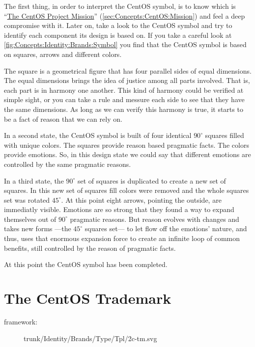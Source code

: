 The first thing, in order to interpret the CentOS symbol, is to know
which is ``\hyperlink{sec:Concepts:CentOS:Mission}{The CentOS Project
Mission}'' (\autoref{sec:Concepts:CentOS:Mission}) and feel a deep
compromise with it.  Later on, take a look to the CentOS symbol and
try to identify each component its design is based on. If you take a
careful look at \autoref{fig:Concepts:Identity:Brands:Symbol} you find
that the CentOS symbol is based on squares, arrows and different
colors.

The square is a geometrical figure that has four parallel sides of
equal dimensions. The equal dimensions brings the idea of justice
among all parts involved. That is, each part is in harmony one
another. This kind of harmony could be verified at simple sight, or
you can take a rule and messure each side to see that they have the
same dimensions.  As long as we can verify this harmony is true, it
starts to be a fact of reason that we can rely on. 

In a second state, the CentOS symbol is built of four identical
$90^{\circ}$ squares filled with unique colors. The squares provide
reason based pragmatic facts. The colors provide emotions. So, in this
design state we could say that different emotions are controlled by
the same pragmatic reasons.

In a third state, the $90^{\circ}$ set of squares is duplicated to
create a new set of squares. In this new set of squares fill colors
were removed and the whole squares set was rotated $45^{\circ}$.  At
this point eight arrows, pointing the outside, are immediatly visible.
Emotions are so strong that they found a way to expand themselves out
of $90^{\circ}$ pragmatic reasons.  But reason evolves with changes
and takes new forms ---the $45^{\circ}$ squares set--- to let flow off
the emotions' nature, and thus, uses that enormous expansion force to
create an infinite loop of common benefits, still controlled by the
reason of pragmatic facts.

At this point the CentOS symbol has been completed.

\section{The CentOS Trademark}
\hypertarget{sec:Concepts:Identity:Brands:Trademark}{}
\label{sec:Concepts:Identity:Brands:Trademark}

\begin{description}
\item[framework:] trunk/Identity/Brands/Type/Tpl/2c-tm.svg
\end{description}

